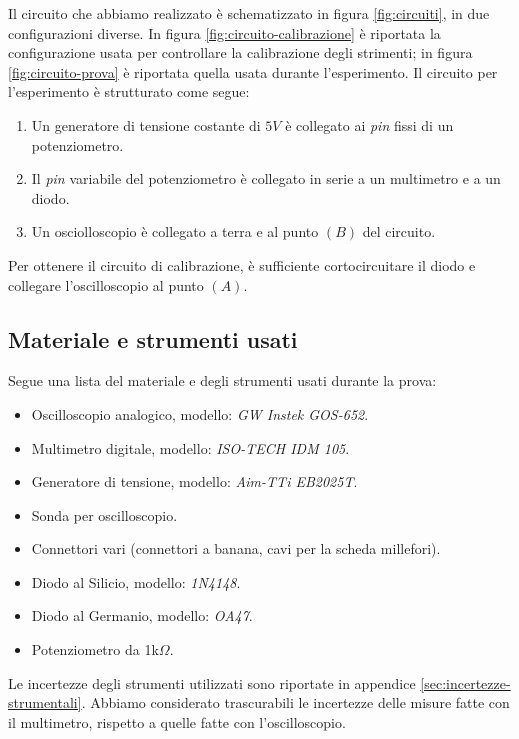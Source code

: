 \documentclass[11pt, a4paper, twoside]{article}
\begin{document}
    Il circuito che abbiamo realizzato è schematizzato in figura \ref{fig:circuiti}, in due configurazioni diverse. In figura \ref{fig:circuito-calibrazione}
    è riportata la configurazione usata per controllare la calibrazione degli strimenti; in figura \ref{fig:circuito-prova}
    è riportata quella usata durante l'esperimento. Il circuito per l'esperimento è strutturato come segue:
    \begin{enumerate}
      \item%
        Un generatore di tensione costante di $5V$ è collegato ai \emph{pin} fissi di un potenziometro.
      \item%
        Il \emph{pin} variabile del potenziometro è collegato in serie a un multimetro e a un diodo.
      \item%
        Un osciolloscopio è collegato a terra e al punto $(B)$ del circuito.
    \end{enumerate}
    Per ottenere il circuito di calibrazione, è sufficiente cortocircuitare il diodo e collegare l'oscilloscopio al punto $(A)$.

  \subsection{Materiale e strumenti usati}\label{subsec:materiali}
    Segue una lista del materiale e degli strumenti usati durante la prova:
      \begin{itemize}
        \item%
          Oscilloscopio analogico, modello: \emph{GW Instek GOS-652}.
        \item%
          Multimetro digitale, modello: \emph{ISO-TECH IDM 105}.
        \item%
          Generatore di tensione, modello: \emph{Aim-TTi EB2025T}.
        \item%
          Sonda per oscilloscopio.
        \item%
          Connettori vari (connettori a banana, cavi per la scheda millefori).
        \item%
          Diodo al Silicio, modello: \emph{1N4148}.
        \item%
          Diodo al Germanio, modello: \emph{OA47}.
        \item
          Potenziometro da 1k$\Omega$.
      \end{itemize}
    Le incertezze degli strumenti utilizzati sono riportate in appendice \ref{sec:incertezze-strumentali}.
    Abbiamo considerato trascurabili le incertezze delle misure fatte con il multimetro, rispetto a quelle fatte con l'oscilloscopio.
\end{document}
